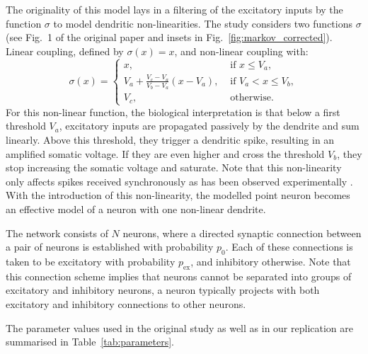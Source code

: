 \documentclass[10pt,a4paper,onecolumn]{article}
\begin{document}
The originality of this model lays in a filtering of the excitatory inputs by the function $\sigma$ to model dendritic non-linearities. The study considers two functions $\sigma$ (see Fig.~1 of the original paper and insets in Fig.~\ref{fig:markov_corrected}). Linear coupling, defined by $\sigma(x)=x$, and non-linear coupling with:
\begin{equation}
    \sigma(x)= 
\begin{cases}
    x,              & \text{ if } x\leq V_a,\\
    V_a + \frac{V_c-V_a}{V_b-V_a} (x - V_a), & \text{ if } V_a<x \leq V_b,\\
    V_c,            & \text{ otherwise.}
\end{cases}
\label{eq:non-linear}
\end{equation}
For this non-linear function, the biological interpretation is that below a first threshold $V_a$, excitatory inputs are propagated passively by the dendrite and sum linearly. Above this threshold, they trigger a dendritic spike, resulting in an amplified somatic voltage. If they are even higher and cross the threshold $V_b$, they stop increasing the somatic voltage and saturate. Note that this non-linearity only affects spikes received synchronously as has been observed experimentally \cite{Softky1994}. With the introduction of this non-linearity, the modelled point neuron becomes an effective model of a neuron with one non-linear dendrite.

The network consists of $N$ neurons, where a directed synaptic connection between a pair of neurons is established with probability $p_0$. Each of these connections is taken to be excitatory with probability $p_\text{ex}$, and inhibitory otherwise. Note that this connection scheme implies that neurons cannot be separated into groups of excitatory and inhibitory neurons, a neuron typically projects with both excitatory and inhibitory connections to other neurons.

The parameter values used in the original study as well as in our replication are summarised in Table~\ref{tab:parameters}.
\end{document}
